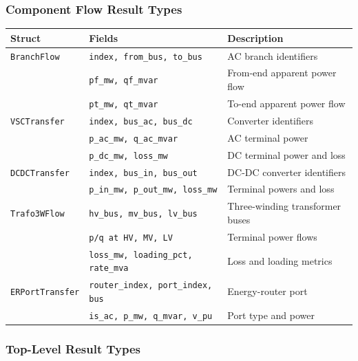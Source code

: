\subsubsection{Component Flow Result Types}

\begin{longtable}{lll}
\hline\hline
\textbf{Struct} & \textbf{Fields} & \textbf{Description} \\
\hline\endhead\hline\endfoot
\texttt{BranchFlow} & \texttt{index, from\_bus, to\_bus} & AC branch identifiers \\
 & \texttt{pf\_mw, qf\_mvar} & From-end apparent power flow \\
 & \texttt{pt\_mw, qt\_mvar} & To-end apparent power flow \\
\hline
\texttt{VSCTransfer} & \texttt{index, bus\_ac, bus\_dc} & Converter identifiers \\
 & \texttt{p\_ac\_mw, q\_ac\_mvar} & AC terminal power \\
 & \texttt{p\_dc\_mw, loss\_mw} & DC terminal power and loss \\
\hline
\texttt{DCDCTransfer} & \texttt{index, bus\_in, bus\_out} & DC-DC converter identifiers \\
 & \texttt{p\_in\_mw, p\_out\_mw, loss\_mw} & Terminal powers and loss \\
\hline
\texttt{Trafo3WFlow} & \texttt{hv\_bus, mv\_bus, lv\_bus} & Three-winding transformer buses \\
 & \texttt{p/q at HV, MV, LV} & Terminal power flows \\
 & \texttt{loss\_mw, loading\_pct, rate\_mva} & Loss and loading metrics \\
\hline
\texttt{ERPortTransfer} & \texttt{router\_index, port\_index, bus} & Energy-router port \\
 & \texttt{is\_ac, p\_mw, q\_mvar, v\_pu} & Port type and power \\
\hline\hline
\end{longtable}

\subsubsection{Top-Level Result Types}

